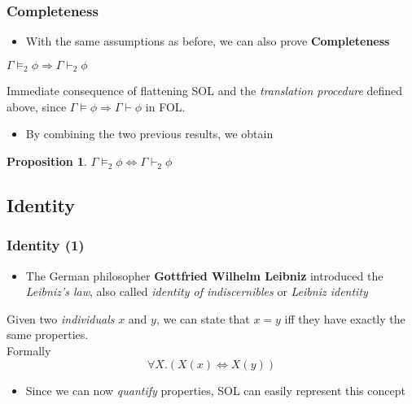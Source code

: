 \documentclass{beamer}
\newenvironment{proofidea}{
    \renewcommand{\proofname}{Proof idea.}\proof
}{\endproof}
\newtheorem{proposition}{Proposition}
\begin{document}
                \begin{frame}
                    \frametitle{Completeness}
                    \begin{itemize}
                        \item With the same assumptions as before, we can also prove \textbf{Completeness}
                    \end{itemize}
                    \begin{theorem}[Completeness]
                        $ \Gamma \vDash_2 \phi \Rightarrow \Gamma \vdash_2 \phi $
                    \end{theorem}
                    \begin{proofidea}
                        Immediate consequence of flattening SOL and the \textit{translation procedure} defined above, since $ \Gamma \vDash \phi \Rightarrow \Gamma \vdash \phi $ in FOL.
                    \end{proofidea}
                    \begin{itemize}
                        \item By combining the two previous results, we obtain
                    \end{itemize}
                    \begin{proposition}
                        $ \Gamma \vDash_2 \phi \Leftrightarrow \Gamma \vdash_2 \phi $
                    \end{proposition}
                \end{frame}

            \subsection{Identity}
                \begin{frame}
                    \frametitle{Identity (1)}
                    \begin{itemize}
                        \item The German philosopher \textbf{Gottfried Wilhelm Leibniz} introduced the \textit{Leibniz's law}, also called \textit{identity of indiscernibles} or \textit{Leibniz identity}
                    \end{itemize}
                    \begin{definition}
                        Given two \textit{individuals} $ x $ and $ y $, we can state that $ x = y $ iff they have exactly the same properties.\\
                        Formally
                        \[
                            \forall X. (X(x) \Leftrightarrow X(y))    
                        \] 
                    \end{definition}
                    \begin{itemize}
                        \item Since we can now \textit{quantify} properties, SOL can easily represent this concept
                    \end{itemize}
                \end{frame}
\end{document}
